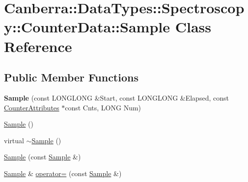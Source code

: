\hypertarget{class_canberra_1_1_data_types_1_1_spectroscopy_1_1_counter_data_1_1_sample}{}\section{Canberra\+:\+:Data\+Types\+:\+:Spectroscopy\+:\+:Counter\+Data\+:\+:Sample Class Reference}
\label{class_canberra_1_1_data_types_1_1_spectroscopy_1_1_counter_data_1_1_sample}
\subsection*{Public Member Functions}
\begin{DoxyCompactItemize}
\item 
\mbox{\label{class_canberra_1_1_data_types_1_1_spectroscopy_1_1_counter_data_1_1_sample_ac36fbbcaae500e4bd9ff3f882a1db70a}} 
{\bfseries Sample} (const L\+O\+N\+G\+L\+O\+NG \&Start, const L\+O\+N\+G\+L\+O\+NG \&Elapsed, const \hyperlink{struct_canberra_1_1_data_types_1_1_spectroscopy_1_1_counter_attributes_tag}{Counter\+Attributes} $\ast$const Cnts, L\+O\+NG Num)
\item 
\hyperlink{class_canberra_1_1_data_types_1_1_spectroscopy_1_1_counter_data_1_1_sample_a8ccfde00d0b622d009bb550ed1565e24_a8ccfde00d0b622d009bb550ed1565e24}{Sample} ()
\item 
virtual \hyperlink{class_canberra_1_1_data_types_1_1_spectroscopy_1_1_counter_data_1_1_sample_a3081fb4c3061025d2f87a8fcf2a9efeb_a3081fb4c3061025d2f87a8fcf2a9efeb}{$\sim$\+Sample} ()
\item 
\hyperlink{class_canberra_1_1_data_types_1_1_spectroscopy_1_1_counter_data_1_1_sample_aab83f09cadd1e87ab23ba08778f97db6_aab83f09cadd1e87ab23ba08778f97db6}{Sample} (const \hyperlink{class_canberra_1_1_data_types_1_1_spectroscopy_1_1_counter_data_1_1_sample}{Sample} \&)
\item 
\hyperlink{class_canberra_1_1_data_types_1_1_spectroscopy_1_1_counter_data_1_1_sample}{Sample} \& \hyperlink{class_canberra_1_1_data_types_1_1_spectroscopy_1_1_counter_data_1_1_sample_a17c3050cd9089530e4d5d77ea83380c7_a17c3050cd9089530e4d5d77ea83380c7}{operator=} (const \hyperlink{class_canberra_1_1_data_types_1_1_spectroscopy_1_1_counter_data_1_1_sample}{Sample} \&)
\item 

\end{DoxyCompactItemize}
